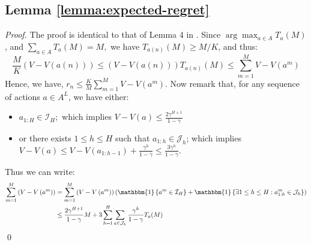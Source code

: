 \documentclass[runningheads, envcountsame, a4paper]{llncs}
\newcommand{\citep}{\cite}
\begin{document}
\subsection{Lemma \ref{lemma:expected-regret}}
\begin{proof}
The proof is identical to that of Lemma 4 in \citep{Bubeck2010}.
Since $\arg \max _{a \in A} T_{a}(M)$, and $\sum_{a \in A} T_{a}(M)=M,$ we have $T_{a(n)}(M) \geq M / K$, and thus:
\begin{equation*}
\frac{M}{K}(V-V(a(n))) \leq(V-V(a(n))) T_{a(n)}(M) \leq \sum_{m=1}^{M} V-V\left(a^{m}\right)
\end{equation*}
Hence, we have, $r_{n} \leq \frac{K}{M} \sum_{m=1}^{M} V-V\left(a^{m}\right)$. Now remark that, for any sequence of actions $a\in A^L$, we have either:
\begin{itemize}
    \item $a_{1 : H} \in \mathcal{I}_{H} ;$ which implies $V-V(a) \leq \frac{2 \gamma^{H+1}}{1-\gamma}$
    \item or there exists $1\leq h \leq H$ such that $a_{1:h} \in \mathcal{J}_h$; which implies $V-V(a) \leq V-V\left(a_{1 : h-1}\right)+\frac{\gamma^{h}}{1-\gamma} \leq \frac{3 \gamma^{h}}{1-\gamma}$.
\end{itemize}
Thus we can write:
\begin{equation*}
\begin{aligned} \sum_{m=1}^{M}\left(V-V\left(a^{m}\right)\right) &=\sum_{m=1}^{M}\left(V-V\left(a^{m}\right)\right)\left(\mathbbm{1}\left\{a^{m} \in \mathcal{I}_{H}\right\}+\mathbbm{1}\left\{\exists 1 \leq h \leq H : a_{1 : h}^{m} \in \mathcal{J}_{h}\right\}\right) \\ & \leq \frac{2 \gamma^{H+1}}{1-\gamma} M+3 \sum_{h=1}^{H} \sum_{a \in \mathcal{J}_{h}} \frac{\gamma^{h}}{1-\gamma} T_{a}(M) \end{aligned}
\end{equation*}
\qed
\end{proof}
\end{document}

